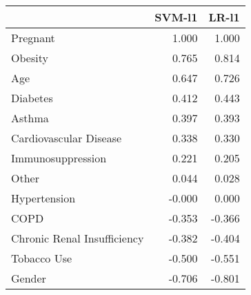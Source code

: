 \begin{tabular}{lrr}
\toprule
{} &  SVM-l1 &  LR-l1 \\
\midrule
Pregnant                    &   1.000 &  1.000 \\
Obesity                     &   0.765 &  0.814 \\
Age                         &   0.647 &  0.726 \\
Diabetes                    &   0.412 &  0.443 \\
Asthma                      &   0.397 &  0.393 \\
Cardiovascular Disease      &   0.338 &  0.330 \\
Immunosuppression           &   0.221 &  0.205 \\
Other                       &   0.044 &  0.028 \\
Hypertension                &  -0.000 &  0.000 \\
COPD                        &  -0.353 & -0.366 \\
Chronic Renal Insufficiency &  -0.382 & -0.404 \\
Tobacco Use                 &  -0.500 & -0.551 \\
Gender                      &  -0.706 & -0.801 \\
\bottomrule
\end{tabular}

